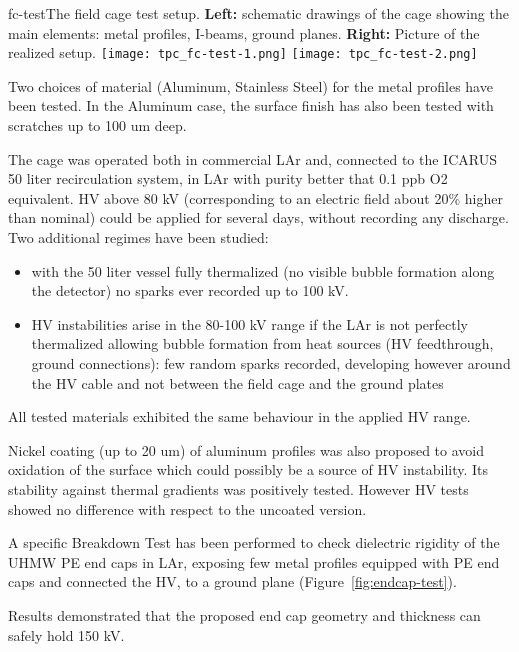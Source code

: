 \begin{cdrfigure}{fc-test}{The field cage test setup. 
 {\bf Left:} schematic drawings of the cage showing the main elements: metal profiles, I-beams, ground planes.
  {\bf Right:} Picture of the realized setup.}
\texttt{[image: tpc\_fc-test-1.png]}
\texttt{[image: tpc\_fc-test-2.png]}
\end{cdrfigure}

Two choices of material (Aluminum, Stainless Steel) for the metal profiles have been tested. In the Aluminum case, the surface finish has also been tested with scratches up to 100 um deep. 

The cage was operated both in commercial LAr and, connected to the ICARUS 50 liter recirculation system, in LAr  with purity  better that 0.1 ppb O2 equivalent. HV above 80 kV (corresponding to an electric field about 20\% higher than nominal) could be applied for several days, without recording any discharge. Two additional regimes have been studied:
\begin{itemize}	
\item  with the 50 liter vessel fully thermalized (no visible bubble formation along the detector) no sparks ever recorded up to 100 kV.
\item  HV instabilities arise in the 80-100 kV range if the LAr is not perfectly thermalized allowing bubble formation from heat sources (HV feedthrough, ground connections): few random sparks recorded, developing however around the HV cable and not between the field cage and the ground plates
\end{itemize}

All tested materials exhibited the same behaviour in the applied HV range. 

Nickel coating (up to 20 um) of aluminum profiles was also proposed  to avoid oxidation of the surface which could possibly be a source of HV instability. Its stability against  thermal gradients was positively tested. However HV tests showed no difference with respect to the uncoated version.

A specific Breakdown Test has been performed to check dielectric rigidity of the UHMW PE end caps in LAr, exposing few metal profiles equipped with PE end caps and connected the HV, to a ground plane (Figure~\ref{fig:endcap-test}).

Results demonstrated that the proposed end cap geometry and thickness can safely hold 150 kV.

